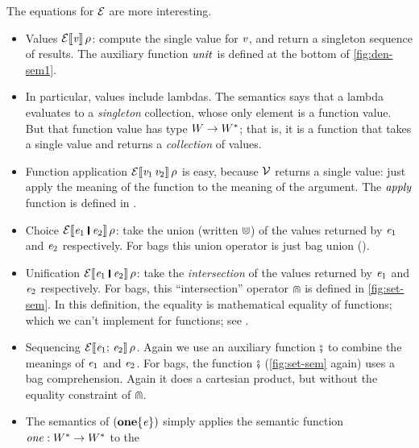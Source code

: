 The equations for $\mathcal{E}$ are more interesting.
\begin{itemize}
\item Values $\mathcal{E}\llbracket \mathit{v} \rrbracket\, \rho$: compute the single value for \ensuremath{\Varid{v}}, and return a singleton sequence of results.
The auxiliary function $\mathit{unit}$ is defined at the bottom of \cref{fig:den-sem1}.
\item In particular, values include lambdas.  The semantics says that a lambda evaluates to a \emph{singleton}
collection, whose only element is a function value. But that function value has
type $W \rightarrow W^{*}$; that is, it is a function that takes a single
value and returns a \emph{collection} of values.
\item Function application $\mathcal{E}\llbracket \mathit{v}_{\mathrm{1}}\,\mathit{v}_{\mathrm{2}} \rrbracket\, \rho$ is easy, because $\mathcal{V}$ returns a single value: just apply
  the meaning of the function to the meaning of the argument.  The $\mathit{apply}$ function is defined in .
\item Choice $\semapp{E}{\ensuremath{\Varid{e}_{\mathrm{1}}\;\rule[-0.3mm]{0.5mm}{2.5mm}\;\Varid{e}_{\mathrm{2}}}}{\rho}$: take the union (written $\Cup$) of the values
  returned by \ensuremath{\Varid{e}_{\mathrm{1}}} and \ensuremath{\Varid{e}_{\mathrm{2}}} respectively.  For bags this union operator is just bag union ().
\item Unification $\semapp{E}{\ensuremath{\Varid{e}_{\mathrm{1}}\;\rule[-0.3mm]{0.5mm}{2.5mm}\;\Varid{e}_{\mathrm{2}}}}{\rho}$: take the \emph{intersection} of the
  values returned by \ensuremath{\Varid{e}_{\mathrm{1}}} and \ensuremath{\Varid{e}_{\mathrm{2}}} respectively. For bags, this ``intersection'' operator $\Cap$
  is defined in \cref{fig:set-sem}. In this definition, the equality is mathematical equality of functions;
  which we can't implement for functions; see .
\item Sequencing $\mathcal{E}\llbracket \mathit{e}_{\mathrm{1}};\,\mathit{e}_{\mathrm{2}} \rrbracket\, \rho$. Again we use an auxiliary function $\fatsemi$ to combine
  the meanings of \ensuremath{\Varid{e}_{\mathrm{1}}} and \ensuremath{\Varid{e}_{\mathrm{2}}}. For bags, the function $\fatsemi$ (\cref{fig:set-sem} again)
  uses a bag comprehension.  Again it does a cartesian product, but without the equality constraint of $\Cap$.
\item The semantics of \ensuremath{(\textbf{one}\{\Varid{e}\})} simply applies the semantic function $\mathit{one} : W^{*} \rightarrow W^{*}$ to the

\end{itemize}
